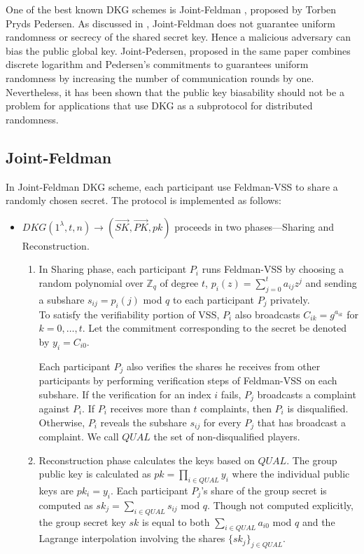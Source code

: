 \documentclass[letterpaper,twocolumn,10pt]{article}
\theoremstyle{definition}
\theoremstyle{remark}
\begin{document}
One of the best known DKG schemes is Joint-Feldman \cite{pedersen1991threshold}, proposed by Torben Pryds Pedersen. As discussed in \cite{gennaro1999secure}, Joint-Feldman does not guarantee uniform randomness or secrecy of the shared secret key. Hence a malicious adversary can bias the public global key. Joint-Pedersen, proposed in the same paper combines discrete logarithm and Pedersen's commitments to guarantees uniform randomness by increasing the number of communication rounds by one.  Nevertheless, it has been shown that the public key biasability should not be a problem for applications that use DKG as a subprotocol for distributed randomness.
\subsection{Joint-Feldman}
\label{appendix:jointFeldman}
In Joint-Feldman DKG scheme, each participant use Feldman-VSS to share a randomly chosen secret. The protocol is implemented as follows:
\begin{itemize}
    \item $DKG(1^{\lambda}, t, n) \rightarrow (\vec{SK}, \vec{PK}, pk)$  proceeds in two phases---Sharing and Reconstruction.
    \begin{enumerate}
        \item In Sharing phase, each participant $P_i$ runs Feldman-VSS by choosing a random polynomial over $\mathbb{Z}_q$ of degree $t$, $p_i(z) = \sum_{j = 0}^{t} a_{ij} z^j$ and sending a subshare $s_{ij} = p_i(j)$ mod $q$ to each participant $P_j$ privately. \\
        To satisfy the verifiability portion of VSS, $P_i$ also broadcasts $C_{ik} = g^{a_{ik}}$ for $k = 0, \ldots, t$. Let the commitment corresponding to the secret be denoted by $y_i = C_{i0}$.
        
        Each participant $P_j$ also verifies the shares he receives from other participants by performing verification steps of Feldman-VSS on each subshare. If the verification for an index $i$ fails, $P_j$ broadcasts a complaint against $P_i$. If $P_i$ receives more than $t$ complaints, then $P_i$ is disqualified. Otherwise, $P_i$ reveals the subshare $s_{ij}$ for every $P_j$ that has broadcast a complaint. We call $QUAL$ the set of non-disqualified players.
        
        \item Reconstruction phase calculates the keys based on $QUAL$.
        The group public key is calculated as $pk = \prod_{i \in QUAL} y_i$ where the individual public keys are $pk_i = y_i$. Each participant $P_j$'s share of the group secret is  computed as $sk_j = \sum_{i \in QUAL} s_{ij}$ mod $q$.  Though not computed explicitly, the group secret key $sk$ is equal to both $\sum_{i \in QUAL} a_{i0}$ mod $q$ and the Lagrange interpolation involving the shares $\{sk_j\}_{j \in QUAL}$.
    \end{enumerate}
\end{itemize}
\end{document}
